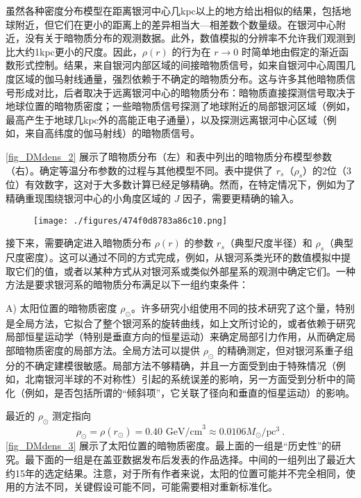 虽然各种密度分布模型在距离银河中心几kpc以上的地方给出相似的结果，包括地球附近，但它们在更小的距离上的差异相当大—相差数个数量级。在银河中心附近，没有关于暗物质分布的观测数据。此外，数值模拟的分辨率不允许我们观测到比大约1kpc更小的尺度。因此，\( \rho(r) \) 的行为在 \( r \to 0 \) 时简单地由假定的渐近函数形式控制。结果，来自银河内部区域的间接暗物质信号，如来自银河中心周围几度区域的伽马射线通量，强烈依赖于不确定的暗物质分布。这与许多其他暗物质信号形成对比，后者取决于远离银河中心的暗物质分布：暗物质直接探测信号取决于地球位置的暗物质密度；一些暗物质信号探测了地球附近的局部银河区域（例如，最高产生于地球几kpc外的高能正电子通量），以及探测远离银河中心区域（例如，来自高纬度的伽马射线）的暗物质信号。

\autoref{fig_DMdens_2} 展示了暗物质分布（左）和表中列出的暗物质分布模型参数（右）。确定等温分布参数的过程与其他模型不同。表中提供了 \( r_s \)（\( \rho_s \)）的2位（3位）有效数字，这对于大多数计算已经足够精确。然而，在特定情况下，例如为了精确重现围绕银河中心的小角度区域的 \( J \) 因子，需要更精确的输入。

\begin{figure}[ht]
\centering
\texttt{[image: ./figures/474f0d8783a86c10.png]}
\caption{} \label{fig_DMdens_2}
\end{figure}

接下来，需要确定进入暗物质分布 \( \rho(r) \) 的参数 \( r_s \)（典型尺度半径）和 \( \rho_s \)（典型尺度密度）。这可以通过不同的方式完成，例如，从银河系类光环的数值模拟中提取它们的值，或者以某种方式从对银河系或类似外部星系的观测中确定它们。一种方法是要求银河系的暗物质分布满足以下一组约束条件：

A) 太阳位置的暗物质密度 \( \rho_\odot \)。许多研究小组使用不同的技术研究了这个量，特别是全局方法，它拟合了整个银河系的旋转曲线，如上文所讨论的，或者依赖于研究局部恒星运动学（特别是垂直方向的恒星运动）来确定局部引力作用，从而确定局部暗物质密度的局部方法。全局方法可以提供 \( \rho_\odot \) 的精确测定，但对银河系重子组分的不确定建模很敏感。局部方法不够精确，并且一方面受到由于特殊情况（例如，北南银河半球的不对称性）引起的系统误差的影响，另一方面受到分析中的简化（例如，是否包括所谓的“倾斜项”，它关联了径向和垂直的恒星运动）的影响。

最近的 \( \rho_\odot \) 测定指向
\begin{equation}\label{eq_DMdens_2}
\rho_\odot = \rho(r_\odot) = 0.40 \text{ GeV/cm}^3 \approx 0.0106 M_\odot/\text{pc}^3 ~. 
\end{equation}
\autoref{fig_DMdens_3} 展示了太阳位置的暗物质密度。最上面的一组是“历史性”的研究。最下面的一组是在盖亚数据发布后发表的作品选择。中间的一组列出了最近大约15年的选定结果。注意，对于所有作者来说，太阳的位置可能并不完全相同，使用的方法不同，关键假设可能不同，可能需要相对重新标准化。

